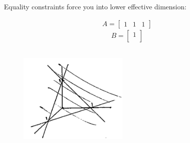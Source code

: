\begin{example}
	Equality constraints force you into lower effective dimension:
	
	\begin{align*}
	A =
	\begin{bmatrix}
	1&1&1
	\end{bmatrix}
	\end{align*}
	\begin{equation*}
	B= 
	\begin{bmatrix}
	1\\
	\end{bmatrix}
	\end{equation*}
	
	\begin{figure}
	\centering
	\includegraphics[width=2.1in,height=2.1in]{figures/ch07/figure1012_3.png}
	\end{figure}
\end{example}

